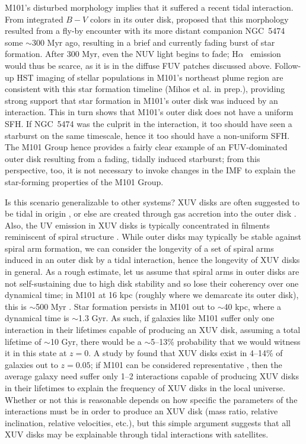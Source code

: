 \documentclass[iop]{emulateapj}
\newcommand{\ha}{H$\alpha$}
\begin{document}
M101's disturbed morphology implies that it suffered a recent tidal
interaction.  From integrated $B-V$ colors in its outer disk,
\citet{mihos13} proposed that this morphology resulted from a fly-by
encounter with its more distant companion NGC~5474 some $\sim$300 Myr
ago, resulting in a brief and currently fading burst of star
formation.  After 300 Myr, even the NUV light begins to fade; \ha
\ emission would thus be scarce, as it is in the diffuse FUV patches
discussed above.  Follow-up HST imaging of stellar populations in
M101's northeast plume region are consistent with this star formation
timeline (Mihos et al. in prep.), providing strong support that star
formation in M101's outer disk was induced by an interaction.  This in
turn shows that M101's outer disk does not have a uniform SFH.  If
NGC~5474 was the culprit in the interaction, it too should have seen a
starburst on the same timescale, hence it too should have a
non-uniform SFH.  The M101 Group hence provides a fairly clear example
of an FUV-dominated outer disk resulting from a fading, tidally
induced starburst; from this perspective, too, it is not necessary to
invoke changes in the IMF to explain the star-forming properties of
the M101 Group.

Is this scenario generalizable to other systems?  XUV disks are often
suggested to be tidal in origin \citep{gildepaz05, thilker05,
  thilker07}, or else are created through gas accretion into the
outer disk \citep{lemonias11}.  Also, the UV emission in XUV disks is
typically concentrated in filments reminiscent of spiral structure
\citep{thilker07}.  While outer disks may typically be stable against
spiral arm formation, we can consider the longevity of a set of spiral
arms induced in an outer disk by a tidal interaction, hence the
longevity of XUV disks in general.  As a rough estimate, let us assume
that spiral arms in outer disks are not self-sustaining due to high
disk stability \citep[e.g.][]{kennicutt89} and so lose their coherency
over one dynamical time; in M101 at 16 kpc (roughly where we demarcate
its outer disk), this is $\sim$500 Myr \citep[assuming a rotation
  speed of $\sim$190 km s$^{-1}$;][]{meidt09}.  Star formation
persists in M101 out to $\sim$40 kpc, where a dynamical time is
$\sim$1.3 Gyr.  As such, if galaxies like M101 suffer only one
interaction in their lifetimes capable of producing an XUV disk,
assuming a total lifetime of $\sim$10 Gyr, there would be a
$\sim$5--13\% probability that we would witness it in this state at
$z=0$.  A study by \citet{lemonias11} found that XUV disks exist in
4--14\% of galaxies out to $z=0.05$; if M101 can be considered
representative \citep[it is slightly brighter than L$^{*}$ in the
  \emph{V}-band;][]{devau91}, then the average galaxy need suffer only
1--2 interactions capable of producing XUV disks in their lifetimes to
explain the frequency of XUV disks in the local universe.  Whether or
not this is reasonable depends on how specific the parameters of the
interactions must be in order to produce an XUV disk (mass ratio,
relative inclination, relative velocities, etc.), but this simple
argument suggests that all XUV disks may be explainable through tidal
interactions with satellites.
\end{document}
